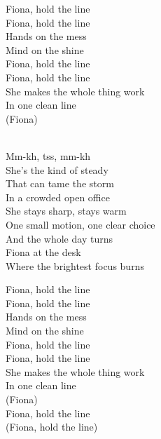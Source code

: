 \begin{lyrics}
Fiona, hold the line\\
Fiona, hold the line\\
Hands on the mess\\
Mind on the shine\\
Fiona, hold the line\\
Fiona, hold the line\\
She makes the whole thing work\\
In one clean line\\
(Fiona)

\\
Mm-kh, tss, mm-kh\\
She’s the kind of steady\\
That can tame the storm\\
In a crowded open office\\
She stays sharp, stays warm\\
One small motion, one clear choice\\
And the whole day turns\\
Fiona at the desk\\
Where the brightest focus burns

Fiona, hold the line\\
Fiona, hold the line\\
Hands on the mess\\
Mind on the shine\\
Fiona, hold the line\\
Fiona, hold the line\\
She makes the whole thing work\\
In one clean line\\
(Fiona)\\
Fiona, hold the line\\
(Fiona, hold the line)

\end{lyrics}

